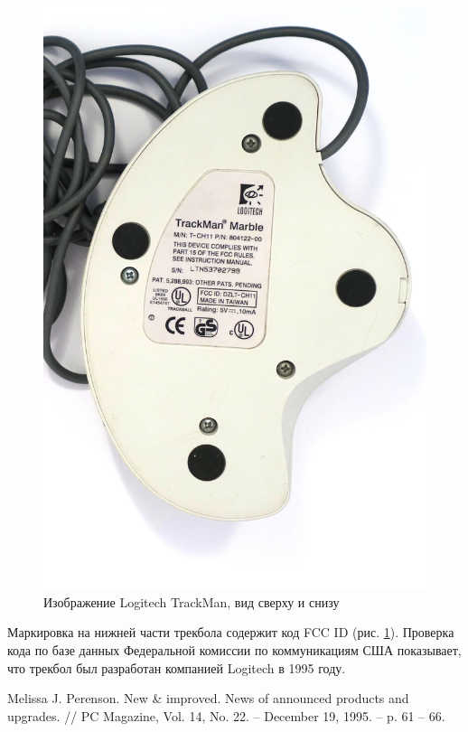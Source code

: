 \documentclass[11pt, a4paper]{article}
\begin{document}
\begin{figure}[h]
    \includegraphics[scale=0.4]{1995_logitech_trackman/bottom_60.jpg}
    \caption{Изображение Logitech TrackMan, вид сверху и снизу}
    \label{fig:trackmanTopAndBottom}
\end{figure}
    
    Маркировка на нижней части трекбола содержит код FCC ID (рис. \ref{fig:trackmanTopAndBottom}).
    Проверка кода по базе данных Федеральной комиссии по коммуникациям США показывает, что трекбол был разработан компанией Logitech в 1995 году.


\begin{thebibliography}{9}
 Melissa J. Perenson. New \& improved. News of announced products and upgrades. // PC Magazine, Vol. 14, No. 22. -- December 19, 1995. -- p. 61 -- 66.
\end{thebibliography}
\end{document}
